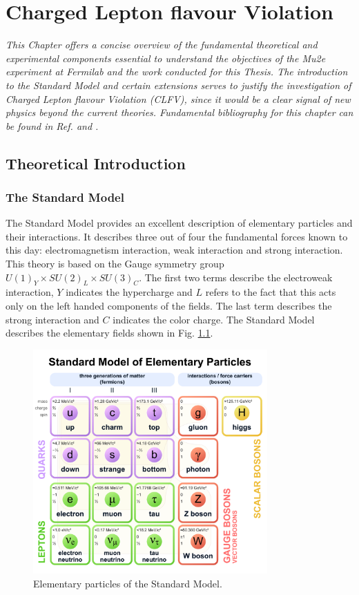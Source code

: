\chapter{Charged Lepton flavour Violation}
\textit{This Chapter offers a concise overview of the fundamental theoretical and experimental components essential to understand the objectives 
of the Mu2e experiment at Fermilab and the work conducted for this Thesis. The introduction to the Standard Model and certain extensions serves to 
justify the investigation of Charged Lepton flavour Violation (CLFV), since it would be a clear signal of new physics beyond the current theories. 
Fundamental bibliography for this chapter can be found in Ref. \cite{Bernstein_2013} and \cite{clfv_signorelli}.}
\section{Theoretical Introduction}
\subsection{The Standard Model}
The Standard Model provides an excellent description of elementary particles and their interactions. It describes three out of 
four the fundamental forces known to this day: electromagnetism interaction, weak interaction and strong interaction. This theory is 
based on the Gauge symmetry group $U(1)_Y \times SU(2)_L \times SU(3)_C$. The first two terms describe the electroweak interaction, $Y$ indicates 
the hypercharge and $L$ refers to the fact that this acts only on the left handed components of the fields. The last term describes the strong interaction and $C$ indicates the color charge.
The Standard Model describes the elementary fields shown in Fig. \ref{fig:sm}.

\begin{figure}[!h]
\centering
\includegraphics[width =0.8\textwidth]{figures/pdf/Standard_Model_of_Elementary_Particles.pdf}
\caption{Elementary particles of the Standard Model.}
\label{fig:sm}
\end{figure}


